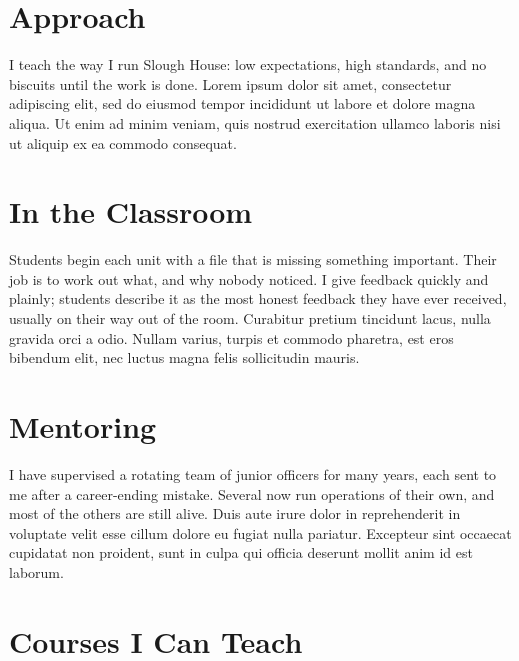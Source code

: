 \documentclass[11pt]{article}
\newcommand{\teachingtitle}{\ifempty{\teachingdocname}{Teaching Statement}{\draftcolor{\teachingdocname}}}
\begin{document}
\makeletterhead
\doctitle{\teachingtitle}
\preparedfor


\section{Approach}
I teach the way I run Slough House: low expectations, high standards, and no biscuits until the work is done. Lorem ipsum dolor sit amet, consectetur adipiscing elit, sed do eiusmod tempor incididunt ut labore et dolore magna aliqua. Ut enim ad minim veniam, quis nostrud exercitation ullamco laboris nisi ut aliquip ex ea commodo consequat.

\section{In the Classroom}
Students begin each unit with a file that is missing something important. Their job is to work out what, and why nobody noticed. I give feedback quickly and plainly; students describe it as the most honest feedback they have ever received, usually on their way out of the room. Curabitur pretium tincidunt lacus, nulla gravida orci a odio. Nullam varius, turpis et commodo pharetra, est eros bibendum elit, nec luctus magna felis sollicitudin mauris.

\section{Mentoring}
I have supervised a rotating team of junior officers for many years, each sent to me after a career-ending mistake. Several now run operations of their own, and most of the others are still alive. Duis aute irure dolor in reprehenderit in voluptate velit esse cillum dolore eu fugiat nulla pariatur. Excepteur sint occaecat cupidatat non proident, sunt in culpa qui officia deserunt mollit anim id est laborum.

\section{Courses I Can Teach}
\end{document}
